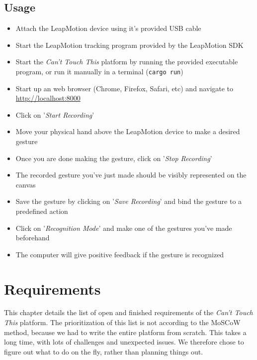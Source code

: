 \documentclass[a4paper]{article}
\providecommand{\tightlist}{%
\setlength{\itemsep}{0pt}\setlength{\parskip}{0pt}}
\begin{document}


  \subsection{Usage}
  \begin{itemize}
    \tightlist{}
    \item Attach the LeapMotion device using it's provided USB cable
    \item Start the LeapMotion tracking program provided by the LeapMotion SDK
    \item Start the \textit{Can't Touch This} platform by running the provided
      executable program, or run it manually in a terminal (\verb_cargo run_)
    \item Start up an web browser (Chrome, Firefox, Safari, etc) and navigate to
      \\ \url{http://localhost:8000}
    \item Click on '\textit{Start Recording}'
    \item Move your physical hand above the LeapMotion device to make a desired
      gesture
    \item Once you are done making the gesture, click on
      '\textit{Stop Recording}'
    \item The recorded gesture you've just made should be visibly represented on
      the canvas
    \item Save the gesture by clicking on '\textit{Save Recording}' and bind the
      gesture to a predefined action
    \item Click on '\textit{Recognition Mode}' and make one of the gestures
      you've made beforehand
    \item The computer will give positive feedback if the gesture is recognized
  \end{itemize}
  \clearpage

  \section{Requirements}
  This chapter details the list of open and finished requirements of the
  \textit{Can't Touch This} platform. The prioritization of this list is not
  according to the MoSCoW method, because we had to write the entire platform
  from scratch. This takes a long time, with lots of challenges and unexpected
  issues. We therefore chose to figure out what to do on the fly, rather than
  planning things out.
\end{document}
